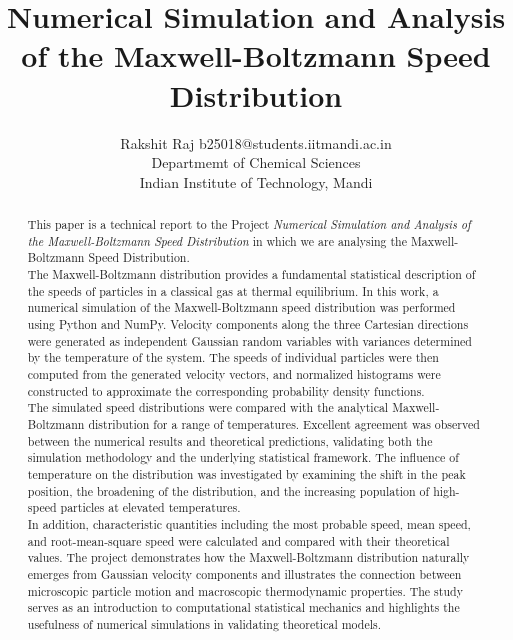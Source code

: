 \documentclass[twoside, 11pt]{article}
\begin{document}
\title{Numerical Simulation and Analysis of the Maxwell-Boltzmann Speed Distribution}

\author{
    \name Rakshit Raj \email b25018@students.iitmandi.ac.in \\
    \addr Departmemt of Chemical Sciences \\
    Indian Institute of Technology, Mandi \\
}

\maketitle

\begin{abstract}
   This paper is a technical report to the Project \textit{Numerical Simulation and Analysis of the Maxwell-Boltzmann Speed Distribution} in which we are analysing the Maxwell-Boltzmann Speed Distribution. \\
   The Maxwell-Boltzmann distribution provides a fundamental statistical description of the speeds of particles in a classical gas at thermal equilibrium. In this work, a numerical simulation of the Maxwell-Boltzmann speed distribution was performed using Python and NumPy. Velocity components along the three Cartesian directions were generated as independent Gaussian random variables with variances determined by the temperature of the system. The speeds of individual particles were then computed from the generated velocity vectors, and normalized histograms were constructed to approximate the corresponding probability density functions. \\
   The simulated speed distributions were compared with the analytical Maxwell-Boltzmann distribution for a range of temperatures. Excellent agreement was observed between the numerical results and theoretical predictions, validating both the simulation methodology and the underlying statistical framework. The influence of temperature on the distribution was investigated by examining the shift in the peak position, the broadening of the distribution, and the increasing population of high-speed particles at elevated temperatures. \\
   In addition, characteristic quantities including the most probable speed, mean speed, and root-mean-square speed were calculated and compared with their theoretical values. The project demonstrates how the Maxwell-Boltzmann distribution naturally emerges from Gaussian velocity components and illustrates the connection between microscopic particle motion and macroscopic thermodynamic properties. The study serves as an introduction to computational statistical mechanics and highlights the usefulness of numerical simulations in validating theoretical models. \\

\end{abstract}
\end{document}
